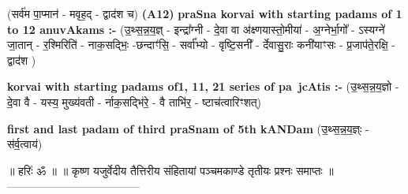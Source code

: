 \documentclass[17pt]{extarticle}
\begin{document}
                  \newline
                      (सर्व॑म पा॒प्मान॑ - मवृह॒द् - द्वाद॑श च)  \textbf{(A12)} \newline \newline
\textbf{praSna korvai with starting padams of 1 to 12 anuvAkams :-} \newline
(उ॒थ्स॒न्न॒य॒ज्ञ् - इन्द्रा᳚ग्नी - दे॒वा वा अ॑क्ष्णयास्तो॒मीया॑ - अ॒ग्नेर्भा॒गो᳚ - ऽस्यग्ने॑ जा॒तान् - र॒श्मिरिति॑ - नाक॒सद्भिः॒ -छन्दाꣳ॑सि॒ - सर्वा᳚भ्यो - वृष्टि॒सनी᳚ - र्देवासु॒राः कनी॑याꣳसः - प्र॒जाप॑ते॒रक्षि॒ - द्वाद॑श ) \newline

\textbf{korvai with starting padams of1, 11, 21 series of pa~jcAtis :-} \newline
(उ॒थ्स॒न्न॒य॒ज्ञो - दे॒वा वै - यस्य॒ मुख्य॑वती - र्नाक॒सद्भि॑रे॒ - वै ताभि॑र॒ - ष्टाच॑त्वारिꣳशत्) \newline

\textbf{first and last padam of third praSnam of 5th kANDam} \newline
(उ॒थ्स॒न्न॒य॒ज्ञ्ः - स॑र्व॒त्वाय॑) \newline 


॥ हरिः॑ ॐ ॥
॥ कृष्ण यजुर्वेदीय तैत्तिरीय संहितायां पञ्चमकाण्डे तृतीयः प्रश्नः समाप्तः ॥
------------------------------------ \newline
\pagebreak
\pagebreak
        
\end{document}
